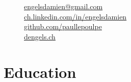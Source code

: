 \documentclass[a4paper,11pt]{article} %
\begin{document}
\pagestyle{empty} %



\par{
\bigskip
\par
} %

\begin{figure}
\vspace{-3.8cm}
\footnotesize

\begin{flushright}

\href{mailto:engelsdamien@gmail.com}{engelsdamien@gmail.com} 
\hspace{0.1cm}
\faEnvelope{}
\\ 

\href{http://ch.linkedin.com/in/engelsdamien}{ch.linkedin.com/in/engelsdamien}
\hspace{0.1cm}
\faLinkedin{}
\\

\href{https://github.com/paullepoulpe}{github.com/paullepoulpe}
\hspace{0.1cm} 
\faGithub{}
\\

\href{http://dengels.ch}{dengels.ch}
\hspace{0.1cm} 
\faLink{} 
\\

\end{flushright}

\end{figure}


\section{Education}
\end{document}
